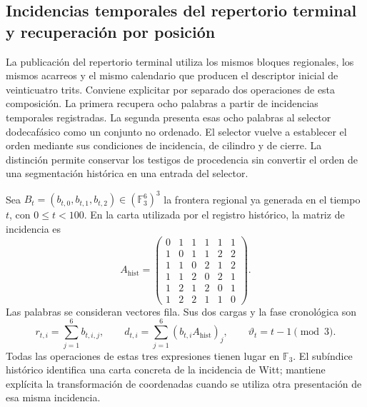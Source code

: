 \subsection{Incidencias temporales del repertorio terminal y recuperación por posición}
\label{sec:repertorio-incidencias-completas}

La publicación del repertorio terminal utiliza los mismos bloques regionales,
los mismos acarreos y el mismo calendario que producen el descriptor inicial
de veinticuatro trits. Conviene explicitar por separado dos operaciones de
esta composición. La primera recupera ocho palabras a partir de incidencias
temporales registradas. La segunda presenta esas ocho palabras al selector
dodecafásico como un conjunto no ordenado. El selector vuelve a establecer
el orden mediante sus condiciones de incidencia, de cilindro y de cierre.
La distinción permite conservar los testigos de procedencia sin convertir
el orden de una segmentación histórica en una entrada del selector.

Sea $B_t=(b_{t,0},b_{t,1},b_{t,2})\in(\mathbb F_3^6)^3$ la frontera
regional ya generada en el tiempo $t$, con $0\leq t<100$. En la carta
utilizada por el registro histórico, la matriz de incidencia es
\[
 A_{\mathrm{hist}}=
 \begin{pmatrix}
 0&1&1&1&1&1\\
 1&0&1&1&2&2\\
 1&1&0&2&1&2\\
 1&1&2&0&2&1\\
 1&2&1&2&0&1\\
 1&2&2&1&1&0
 \end{pmatrix}.
\]
Las palabras se consideran vectores fila. Sus dos cargas y la fase
cronológica son
\[
 r_{t,i}=\sum_{j=1}^{6}b_{t,i,j},\qquad
 d_{t,i}=\sum_{j=1}^{6}(b_{t,i}A_{\mathrm{hist}})_j,
 \qquad \vartheta_t=t-1\pmod 3.
\]
Todas las operaciones de estas tres expresiones tienen lugar en
$\mathbb F_3$. El subíndice histórico identifica una carta concreta de
la incidencia de Witt; mantiene explícita la transformación de coordenadas
cuando se utiliza otra presentación de esa misma incidencia.

